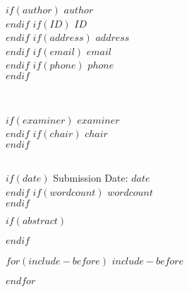 \documentclass[$if(fontsize)$$fontsize$,$endif$$if(lang)$$babel-lang$,$endif$$if(papersize)$$papersize$paper,$endif$$for(classoption)$$classoption$$sep$,$endfor$]{article}
\begin{document}
\begin{titlepage}
\begin{center}
\begin{minipage}[t]{0.5\textwidth}
\begin{flushleft} 
\singlespacing 
$if(author)$ \textbf{$author$}  \\ $endif$
$if(ID)$ $ID$ \\ $endif$
$if(address)$ $address$  \\ $endif$
$if(email)$ $email$  \\ $endif$
$if(phone)$ $phone$  \\ $endif$
\end{flushleft}
\end{minipage}
\begin{minipage}[t]{0.4\textwidth}
\hfill
\end{minipage}\\
\vspace{0.2cm}
\begin{minipage}[t]{0.35\textwidth}
\hfill
\end{minipage}
\begin{minipage}[t]{$mp$\textwidth}
\begin{flushright} 
\singlespacing 
$if(examiner)$     $examiner$  \\       $endif$ 
$if(chair)$     $chair$   \\      $endif$
\end{flushright}
\end{minipage}\\
% 
      

         \vfill
        $if(date)$ Submission Date: $date$ \\ $endif$ 
        $if(wordcount)$ $wordcount$ \\ $endif$ 
        




         \vfill



     \end{center}
    \thispagestyle{empty}
\end{titlepage}

\newpage


$if(abstract)$
 \begin{abstract}
     $abstract$
 \end{abstract}
 \newpage
$endif$


   
$for(include-before)$
$include-before$

$endfor$
\end{document}
